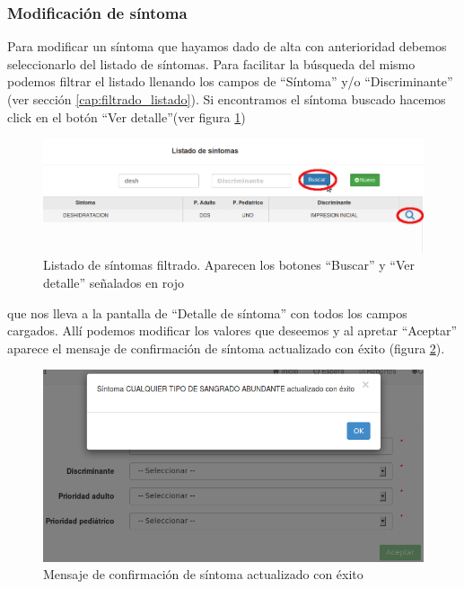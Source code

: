 \subsubsection{Modificación de síntoma}\label{cap:modificacion_sintoma}
Para modificar un síntoma que hayamos dado de alta con anterioridad debemos seleccionarlo del listado de síntomas. Para facilitar la búsqueda del mismo podemos filtrar el listado llenando los campos de ``Síntoma'' y/o ``Discriminante'' (ver sección \ref{cap:filtrado_listado}). Si encontramos el síntoma buscado hacemos click en el botón ``Ver detalle''(ver figura \ref{fig:sintomas_filtro}) 
\begin{figure}
\centerline{\includegraphics[width=1\textwidth]{sintomas_listado_buscar.png}}
\caption{Listado de síntomas filtrado. Aparecen los botones ``Buscar'' y ``Ver detalle'' señalados en rojo}
\label{fig:sintomas_filtro}
\end{figure}
que nos lleva a la pantalla de ``Detalle de síntoma'' con todos los campos cargados. Allí podemos modificar los valores que deseemos y al apretar ``Aceptar'' aparece el mensaje de confirmación de síntoma actualizado con éxito (figura \ref{fig:sintoma_actualizado_con_exito}).
\begin{figure}
\centerline{\includegraphics[width=1\textwidth]{sintoma_actualizado_con_exito.png}}
\caption{Mensaje de confirmación de síntoma actualizado con éxito}
\label{fig:sintoma_actualizado_con_exito}
\end{figure}

